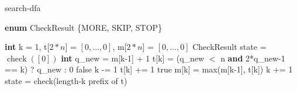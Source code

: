 \begin{algorithm}
  \caption{{\sc search-dfa}}\label{alg:search-dfa}

  \begin{algorithmic}[1]
    \State \textbf{enum} CheckResult \{MORE, SKIP, STOP\}
    \Statex

    \State \textbf{int} k = 1, t[$2*n$] = $[0,\ldots,0]$, m[$2*n$] = $[0,\ldots,0]$
    \State CheckResult state = $\operatorname{check}([0])$
    \Loop
    \State \textbf{int} q\_new = m[k-1] + 1
    \State t[k] = (q\_new $<$ \textrm{n} \textbf{and} 2*q\_new-1 == k) ? q\_new : 0
    \Repeat
    \Return false
    \EndIf
    \State k -= 1
    \State t[k] += 1
    \Else\;\Return true
    \EndIf
    \State m[k] = max(m[k-1], t[k])
    \State k += 1
    \State state = check(length-k prefix of t)
    \EndLoop
    \EndProcedure

  \end{algorithmic}
\end{algorithm}


